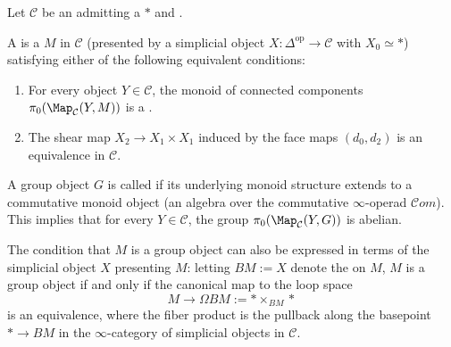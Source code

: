 \begin{definition} \label{definition:group_object_in_an_infty_category}
    Let $\mathcal{C}$ be an  admitting a  $*$ and .

    A  is a  $M$ in $\mathcal{C}$ (presented by a simplicial object $X : \Delta^{\mathrm{op}} \to \mathcal{C}$ with $X_0 \simeq *$) satisfying either of the following equivalent conditions:
    \begin{enumerate}
        \item For every object $Y \in \mathcal{C}$, the monoid of connected components $\pi_0(\Map_{\mathcal{C}}(Y, M))$ is a .
        \item The shear map $X_2 \to X_1 \times X_1$ induced by the face maps $(d_0, d_2)$ is an equivalence in $\mathcal{C}$.
    \end{enumerate}

    A group object $G$ is called  if its underlying monoid structure extends to a commutative monoid object (an algebra over the commutative $\infty$-operad $\mathcal{C}om$). This implies that for every $Y \in \mathcal{C}$, the group $\pi_0(\Map_{\mathcal{C}}(Y, G))$ is abelian.

    The condition that $M$ is a group object can also be expressed in terms of the simplicial object $X$ presenting $M$: letting $B M := X$ denote the  on $M$, $M$ is a group object if and only if the canonical map to the loop space
    $$M \to \Omega B M := * \times_{BM} *$$
    is an equivalence, where the fiber product is the pullback along the basepoint $* \to B M$ in the $\infty$-category of simplicial objects in $\mathcal{C}$.
\end{definition}


